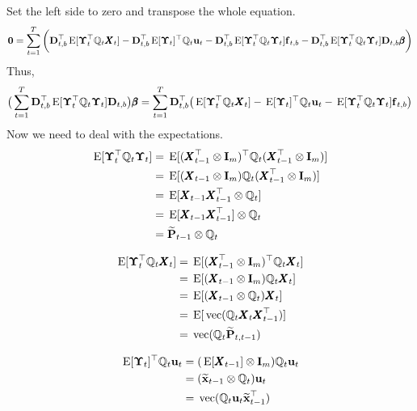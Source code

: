 \documentclass[]{article}
\def\bbeta{\pmb{\beta}}
\def\DD{\mbox{$\mathbf D$}}	\def\dd{\mbox{$\mathbf d$}}
\def\E{\,\textup{\textrm{E}}}
\def\II{\mbox{$\mathbf I$}} \def\ii{\mbox{$\mathbf i$}}
\def\PP{\mbox{$\mathbf P$}}  \def\pp{\mbox{$\mathbf p$}}
\def\XX{\mbox{$\pmb{X}$}}	\def\xx{\mbox{$\pmb{x}$}}
\def\vec{\,\textup{\textrm{vec}}}
\def\hatxtm{\widetilde{\mbox{$\mathbf x$}}_{t-1}}
\def\hatPtm{\widetilde{\PP}_{t-1}}
\def\hatPttm{\widetilde{\PP}_{t,t-1}}
\begin{document}
Set the left side to zero and transpose the whole equation. 
\begin{equation}
\mathbf{0}
 = \sum_{t=1}^T \bigg(
\DD_{t,b}^\top\E[\Bm_t^\top\Qm_t\XX_t]- \DD_{t,b}^\top\E[\Bm_t]^\top\Qm_t\uu_t
 - \DD_{t,b}^\top\E[\Bm_t^\top\Qm_t\Bm_t]\ff_{t,b}
 - \DD_{t,b}^\top\E[\Bm_t^\top\Qm_t\Bm_t]\DD_{t,b}\bbeta \bigg)
\end{equation}
Thus,
\begin{equation}
\big(\sum_{t=1}^T \DD_{t,b}^\top\E[\Bm_t^\top\Qm_t\Bm_t]\DD_{t,b} \big)\bbeta
 = \sum_{t=1}^T \DD_{t,b}^\top\big(
 \E[\Bm_t^\top\Qm_t\XX_t]
 - \E[\Bm_t]^\top\Qm_t\uu_t
  - \E[\Bm_t^\top\Qm_t\Bm_t]\ff_{t,b} \big)
\end{equation}
Now we need to deal with the expectations.
\begin{equation}\label{eq:B.expect1}
\begin{split}
\E[\Bm_t^\top\Qm_t\Bm_t]
&=\E[(\XX_{t-1}^\top \otimes \II_m)^\top\Qm_t(\XX_{t-1}^\top \otimes \II_m)]\\
&=\E[(\XX_{t-1} \otimes \II_m)\Qm_t(\XX_{t-1}^\top \otimes \II_m)]\\
&=\E[\XX_{t-1}\XX_{t-1}^\top \otimes \Qm_t]\\
&=\E[\XX_{t-1}\XX_{t-1}^\top] \otimes \Qm_t\\
&=\hatPtm \otimes \Qm_t
\end{split}
\end{equation}

\begin{equation}\label{eq:B.expect2}
\begin{split}
\E[\Bm_t^\top\Qm_t\XX_t]
&=\E[(\XX_{t-1}^\top \otimes \II_m)^\top\Qm_t\XX_t]\\
&=\E[(\XX_{t-1} \otimes \II_m)\Qm_t\XX_t]\\
&=\E[(\XX_{t-1} \otimes \Qm_t)\XX_t]\\
&=\E[\vec(\Qm_t\XX_t\XX_{t-1}^\top)]\\
&=\vec(\Qm_t\hatPttm)
\end{split}
\end{equation}

\begin{equation}\label{eq:B.expect3}
\begin{split}
\E[\Bm_t]^\top\Qm_t\uu_t&=(\E[\XX_{t-1}] \otimes \II_m)\Qm_t\uu_t \\
&= (\hatxtm \otimes \Qm_t)\uu_t \\
&= \vec(\Qm_t\uu_t\hatxtm^\top)
\end{split}
\end{equation}
\end{document}
